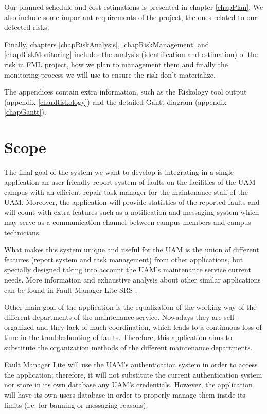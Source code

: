 \documentclass[11pt]{report}
\newcounter{risks}[subsection]
\begin{document}
Our planned schedule and cost estimations is presented in chapter \ref{chapPlan}. We also include some important requirements of the project, the ones related to our detected risks.

Finally, chapters \ref{chapRiskAnalysis}, \ref{chapRiskManagement} and \ref{chapRiskMonitoring} includes the analysis (identification and estimation) of the risk in FML project, how we plan to management them and finally the monitoring process we will use to ensure the risk don't materialize.

The appendices contain extra information, such as the Riskology tool output (appendix \ref{chapRiskology}) and the detailed Gantt diagram (appendix \ref{chapGantt}).

\section{Scope}

The final goal of the system we want to develop is integrating in a single application an user-friendly report system of faults on the facilities of the UAM campus with an efficient repair task manager for the maintenance staff of the UAM. Moreover, the application will provide statistics of the reported faults and will count with extra features such as a notification and messaging system which may serve as a communication channel between campus members and campus technicians.

What makes this system unique and useful for the UAM is the union of different features (report system and task management) from other applications, but specially designed taking into account the UAM's maintenance service current needs. More information and exhaustive analysis about other similar applications can be found in Fault Manager Lite SRS \cite{requirements15}.

Other main goal of the application is the equalization of the working way of the different departments of the maintenance service. Nowadays they are self-organized and they lack of much coordination, which leads to a continuous loss of time in the troubleshooting of faults. Therefore, this application aims to substitute the organization methods of the different maintenance departments.

Fault Manager Lite will use the UAM's authentication system in order to access the application; therefore, it will not substitute the current authentication system nor store in its own database any UAM's credentials. However, the application will have its own users database in order to properly manage them inside its limits (i.e. for banning or messaging reasons).
\end{document}
